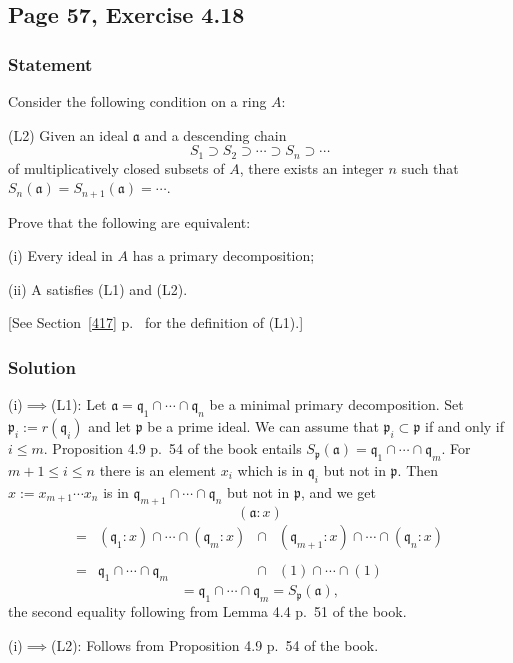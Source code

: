 \documentclass[parskip=half,fontsize=12pt]{scrartcl}%
\newcommand{\mf}{\mathfrak}
\newcommand{\aaa}{\mf a}
\newcommand{\ppp}{\mf p}
\newcommand{\qqq}{\mf q}
\begin{document}
\subsection{Page 57, Exercise 4.18}%

\subsubsection{Statement}%

Consider the following condition on a ring $A$:

(L2) Given an ideal $\mathfrak a$ and a descending chain 
$$
S_1\supset S_2\supset\cdots\supset S_n\supset\cdots
$$ 
of multiplicatively closed subsets of $A$, there exists an integer $n$ such that $S_n(\mathfrak a)=S_{n+1}(\mathfrak a)=\cdots$. %

Prove that the following are equivalent:

(i) Every ideal in $A$ has a primary decomposition;

(ii) A satisfies (L1) and (L2).

[See Section~\ref{417} p.~\pageref{417} for the definition of (L1).]

\subsubsection{Solution}%

(i)$\implies$(L1): Let $\aaa=\qqq_1\cap\cdots\cap\qqq_n$ be a minimal primary decomposition. Set $\ppp_i:=r(\qqq_i)$ and let $\ppp$ be a prime ideal. We can assume that $\ppp_i\subset\ppp$ if and only if $i\le m$. Proposition 4.9 p.~54 of the book entails $S_\ppp(\aaa)=\qqq_1\cap\cdots\cap\qqq_m$. For $m+1\le i\le n$ there is an element $x_i$ which is in $\qqq_i$ but not in $\ppp$. Then $x:=x_{m+1}\cdots x_n$ is in $\qqq_{m+1}\cap\cdots\cap\qqq_n$ but not in $\ppp$, and we get 
$$
(\aaa:x)
$$
$$
\begin{matrix}
=&(\qqq_1:x)\cap\cdots\cap(\qqq_m:x)&\cap&(\qqq_{m+1}:x)\cap\cdots\cap(\qqq_n:x)\\ \\ 
=&\qqq_1\cap\cdots\cap\qqq_m&\cap&(1)\cap\cdots\cap(1)
\end{matrix}
$$
$$
=\qqq_1\cap\cdots\cap\qqq_m=S_\ppp(\aaa),
$$ 
the second equality following from Lemma 4.4 p.~51 of the book.

(i)$\implies$(L2): Follows from Proposition 4.9 p.~54 of the book.
\end{document}

